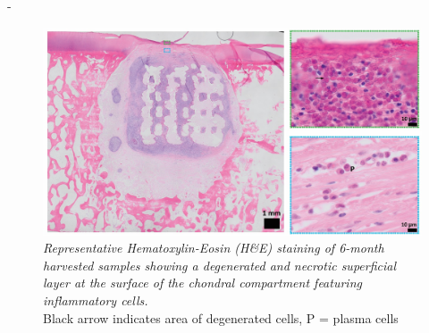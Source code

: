 \documentclass[twocolumn, empirical, authordate, issue]{jote-new-article}
\begin{document}
\begin{adjustwidth}{-\fullwidthlen}{}
\begin{figure}
\includegraphics[width=\columnwidth]{media/image15.jpg}
\caption{\emph{Representative Hematoxylin-Eosin (H\&E) staining of 6-month harvested samples showing a degenerated and necrotic superficial layer at the surface of the chondral compartment featuring inflammatory cells.}\\  Black arrow indicates area of degenerated cells, P = plasma cells}
\label{fig:sup4}\end{figure}



\end{adjustwidth}
\end{document}
